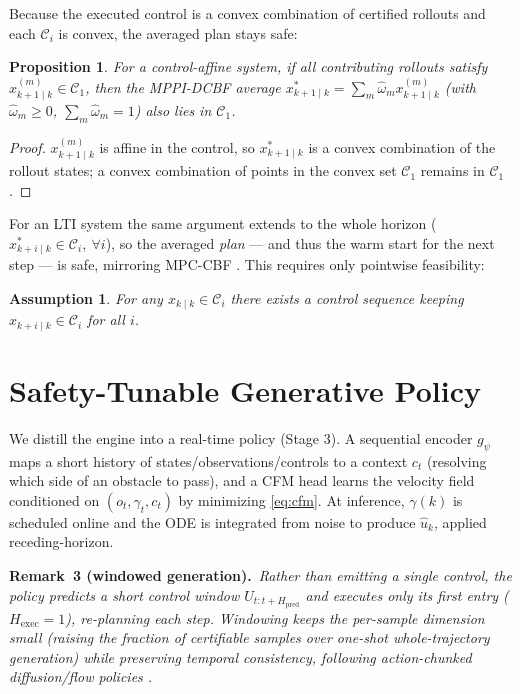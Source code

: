 \documentclass[letterpaper, 10 pt, conference]{ieeeconf}
\newtheorem{assumption}{Assumption}
\newtheorem{proposition}{Proposition}
\newcommand{\Remark}[2][]{\smallskip\noindent\textbf{Remark#1.}~\textit{#2}\smallskip}
\begin{document}
Because the executed control is a convex combination of certified rollouts and each $\mathcal C_i$ is convex, the averaged plan stays safe:
\begin{proposition}\label{prop:1}
For a control-affine system, if all contributing rollouts satisfy $x^{(m)}_{k+1\mid k}\in\mathcal C_1$, then the MPPI-DCBF average $x^*_{k+1\mid k}=\sum_m\hat\omega_m x^{(m)}_{k+1\mid k}$ (with $\hat\omega_m\!\ge\!0$, $\sum_m\hat\omega_m\!=\!1$) also lies in $\mathcal C_1$.
\end{proposition}
\begin{proof}
$x^{(m)}_{k+1\mid k}$ is affine in the control, so $x^*_{k+1\mid k}$ is a convex combination of the rollout states; a convex combination of points in the convex set $\mathcal C_1$ remains in $\mathcal C_1$.
\end{proof}
\noindent For an LTI system the same argument extends to the whole horizon ($x^*_{k+i\mid k}\in\mathcal C_i,\ \forall i$), so the averaged \emph{plan} --- and thus the warm start for the next step --- is safe, mirroring MPC-CBF \cite{zeng2021safety}. This requires only pointwise feasibility:
\begin{assumption}\label{ass:1}
For any $x_{k\mid k}\in\mathcal C_i$ there exists a control sequence keeping $x_{k+i\mid k}\in\mathcal C_i$ for all $i$.
\end{assumption}

\section{Safety-Tunable Generative Policy}
We distill the engine into a real-time policy (Stage 3). A sequential encoder $g_\psi$ maps a short history of states/observations/controls to a context $c_t$ (resolving which side of an obstacle to pass), and a CFM head learns the velocity field conditioned on $(o_t,\gamma_t,c_t)$ by minimizing \eqref{eq:cfm}. At inference, $\gamma(k)$ is scheduled online and the ODE is integrated from noise to produce $\hat u_k$, applied receding-horizon.

\Remark[~3 (windowed generation)]{Rather than emitting a single control, the policy predicts a short \emph{control window} $U_{t:t+H_{\text{pred}}}$ and executes only its first entry ($H_{\text{exec}}{=}1$), re-planning each step. Windowing keeps the per-sample dimension small (raising the fraction of certifiable samples over one-shot whole-trajectory generation) while preserving temporal consistency, following action-chunked diffusion/flow policies \cite{chi2023diffusion, kurtz2025generative}.}
\end{document}
